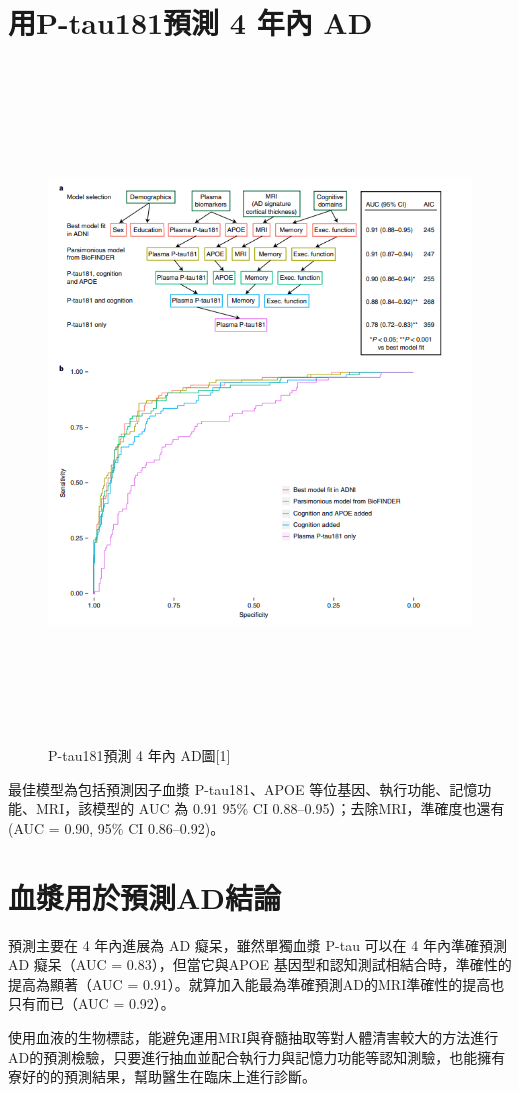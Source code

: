 \section{用P-tau181預測 4 年內 AD }
\begin{figure}[H]
	\centering
	\centerline{\includegraphics[height=18cm]{pic/AD181.PNG}}
	\caption{P-tau181預測 4 年內 AD圖[1]}

	\label{fig:AD181}
\end{figure}
最佳模型為包括預測因子血漿 P-tau181、APOE 等位基因、執行功能、記憶功能、MRI，該模型的 AUC 為 0.91 95\% CI 0.88–0.95）；去除MRI，準確度也還有 (AUC = 0.90, 95\% CI 0.86–0.92)。


\section{血漿用於預測AD結論}
預測主要在 4 年內進展為 AD 癡呆，雖然單獨血漿 P-tau 可以在 4 年內準確預測 AD 癡呆（AUC = 0.83），但當它與APOE 基因型和認知測試相結合時，準確性的提高為顯著（AUC = 0.91）。就算加入能最為準確預測AD的MRI準確性的提高也只有而已（AUC = 0.92）。

使用血液的生物標誌，能避免運用MRI與脊髓抽取等對人體清害較大的方法進行AD的預測檢驗，只要進行抽血並配合執行力與記憶力功能等認知測驗，也能擁有寮好的的預測結果，幫助醫生在臨床上進行診斷。
